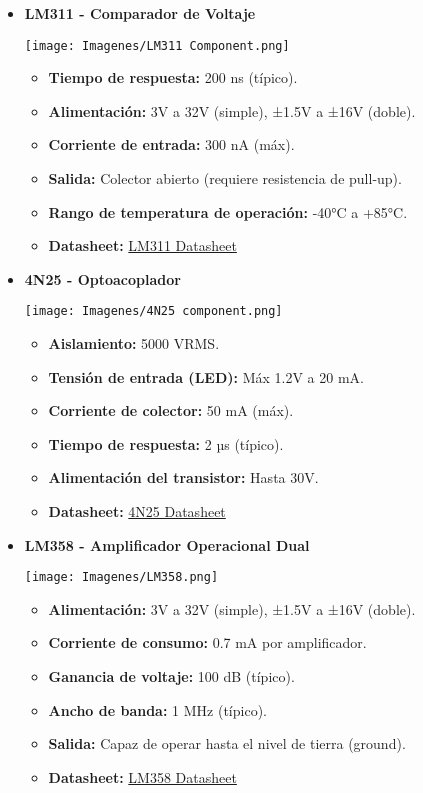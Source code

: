 \begin{itemize}
    \item \textbf{LM311 - Comparador de Voltaje} 
    \begin{center}
        \texttt{[image: Imagenes/LM311 Component.png]}
    \end{center}
    \begin{itemize}
        \item \textbf{Tiempo de respuesta:} 200 ns (típico).
        \item \textbf{Alimentación:} 3V a 32V (simple), ±1.5V a ±16V (doble).
        \item \textbf{Corriente de entrada:} 300 nA (máx).
        \item \textbf{Salida:} Colector abierto (requiere resistencia de pull-up).
        \item \textbf{Rango de temperatura de operación:} -40°C a +85°C.
        \item \textbf{Datasheet:} \href{https://www.ti.com/lit/ds/symlink/lm311.pdf}{LM311 Datasheet}
    \end{itemize}

    \item \textbf{4N25 - Optoacoplador} 
    \begin{center}
        \texttt{[image: Imagenes/4N25 component.png]}
    \end{center}
    \begin{itemize}
        \item \textbf{Aislamiento:} 5000 VRMS.
        \item \textbf{Tensión de entrada (LED):} Máx 1.2V a 20 mA.
        \item \textbf{Corriente de colector:} 50 mA (máx).
        \item \textbf{Tiempo de respuesta:} 2 µs (típico).
        \item \textbf{Alimentación del transistor:} Hasta 30V.
        \item \textbf{Datasheet:} \href{https://www.vishay.com/docs/83725/4n25.pdf}{4N25 Datasheet}
    \end{itemize}

    \item \textbf{LM358 - Amplificador Operacional Dual} 
    \begin{center}
        \texttt{[image: Imagenes/LM358.png]}
    \end{center}
    \begin{itemize}
        \item \textbf{Alimentación:} 3V a 32V (simple), ±1.5V a ±16V (doble).
        \item \textbf{Corriente de consumo:} 0.7 mA por amplificador.
        \item \textbf{Ganancia de voltaje:} 100 dB (típico).
        \item \textbf{Ancho de banda:} 1 MHz (típico).
        \item \textbf{Salida:} Capaz de operar hasta el nivel de tierra (ground).
        \item \textbf{Datasheet:} \href{https://www.ti.com/lit/ds/symlink/lm358.pdf}{LM358 Datasheet}
    \end{itemize}


\end{itemize}
